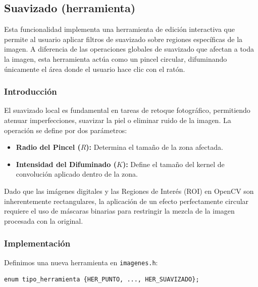 \documentclass[11pt]{article}
\begin{document}
          \clearpage

  \subsection{Suavizado (herramienta)}

      \noindent
      Esta funcionalidad implementa una herramienta de edición interactiva que permite al usuario aplicar filtros de suavizado sobre regiones específicas de la imagen. A diferencia de las operaciones globales de suavizado que afectan a toda la imagen, esta herramienta actúa como un pincel circular, difuminando únicamente el área donde el usuario hace clic con el ratón.

      \subsubsection{Introducción}

          \noindent
          El suavizado local es fundamental en tareas de retoque fotográfico, permitiendo atenuar imperfecciones, suavizar la piel o eliminar ruido de la imagen. La operación se define por dos parámetros:

          \begin{itemize}
              \item \textbf{Radio del Pincel (\(R\)):} Determina el tamaño de la zona afectada.
              \item \textbf{Intensidad del Difuminado (\(K\)):} Define el tamaño del kernel de convolución aplicado dentro de la zona.
          \end{itemize}

          Dado que las imágenes digitales y las Regiones de Interés (ROI) en OpenCV son
          inherentemente rectangulares, la aplicación de un efecto perfectamente circular
          requiere el uso de máscaras binarias para restringir la mezcla de la imagen
          procesada con la original.

      \subsubsection{Implementación}

          \noindent
          Definimos una nueva herramienta en \texttt{imagenes.h}:

          \begin{lstlisting}[style=CppQtStyle]
    enum tipo_herramienta {HER_PUNTO, ..., HER_SUAVIZADO};
\end{lstlisting}
\end{document}
